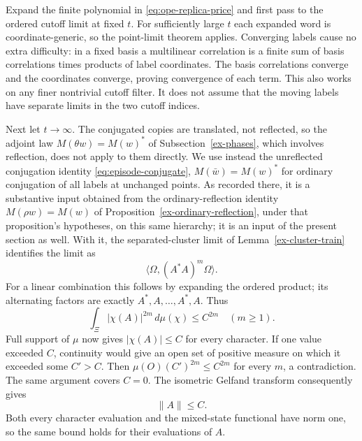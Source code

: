 Expand the finite polynomial in \eqref{eq:ope-replica-price} and first
pass to the ordered cutoff limit at fixed $t$. For sufficiently large
$t$ each expanded word is coordinate-generic, so the point-limit theorem
applies. Converging labels cause no extra difficulty: in a fixed basis
a multilinear correlation is a finite sum of basis correlations times
products of label coordinates. The basis correlations converge and the
coordinates converge, proving convergence of each term. This also works
on any finer nontrivial cutoff filter. It does not assume that the moving
labels have separate limits in the two cutoff indices.

Next let $t\to\infty$. The conjugated copies are translated, not
reflected, so the adjoint law $M(\theta w)=M(w)^*$ of
Subsection~\ref{ex-phases}, which involves reflection, does not apply to
them directly. We use instead the unreflected conjugation identity
\eqref{eq:episode-conjugate}, $M(\bar w)=M(w)^*$ for ordinary
conjugation of all labels at unchanged points. As recorded there, it is
a substantive input obtained from the ordinary-reflection identity
$M(\rho w)=M(w)$ of Proposition~\ref{ex-ordinary-reflection}, under that
proposition's hypotheses, on this same hierarchy; it is an input of the
present section as well. With it, the separated-cluster limit of
Lemma~\ref{ex-cluster-train} identifies the limit as
\[
 \langle\Omega,(A^*A)^m\Omega\rangle.
\]
For a linear combination this follows by expanding the ordered product;
its alternating factors are exactly $A^*,A,\ldots,A^*,A$. Thus
\[
 \int_\Xi|\chi(A)|^{2m}\,d\mu(\chi)\leq C^{2m}
                  \quad(m\geq1).
\]
Full support of $\mu$ now gives $|\chi(A)|\leq C$ for every character.
If one value exceeded $C$, continuity would give an open set of positive
measure on which it exceeded some $C'>C$. Then
$\mu(O)(C')^{2m}\leq C^{2m}$ for every $m$, a contradiction. The same
argument covers $C=0$. The isometric Gelfand transform consequently gives
\begin{equation}\label{eq:ope-ground-price}
 \|A\|\leq C.
\end{equation}
Both every character evaluation and the mixed-state functional have norm
one, so the same bound holds for their evaluations of $A$.

